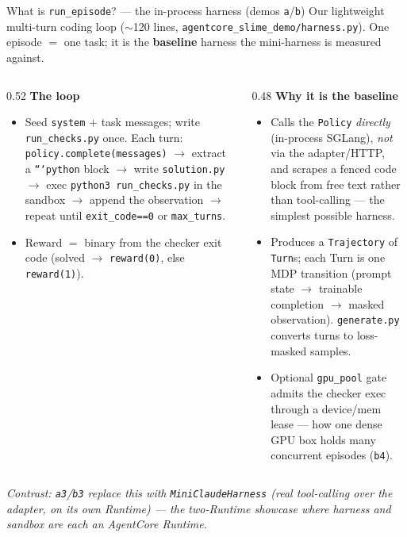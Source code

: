 \documentclass[aspectratio=169]{beamer}
\begin{document}
\begin{frame}{What is \texttt{run\_episode}? --- the in-process harness (demos \texttt{a}/\texttt{b})}
  \footnotesize Our lightweight multi-turn coding loop ($\sim$120 lines,
  \texttt{agentcore\_slime\_demo/harness.py}). One episode $=$ one task; it is the \textbf{baseline}
  harness the mini-harness is measured against.
  \begin{columns}[T]
    \begin{column}{0.52\textwidth}
      \textbf{The loop}
      \begin{itemize}\setlength\itemsep{0.12em}
        \item Seed \texttt{system} $+$ task messages; write \texttt{run\_checks.py} once. Each turn:
          \texttt{policy.complete(messages)} $\to$ extract a \texttt{```python} block $\to$ write
          \texttt{solution.py} $\to$ exec \texttt{python3 run\_checks.py} in the sandbox $\to$ append the
          observation $\to$ repeat until \texttt{exit\_code==0} or \texttt{max\_turns}.
        \item Reward $=$ binary from the checker exit code (solved $\to$ \texttt{reward(0)}, else
          \texttt{reward(1)}).
      \end{itemize}
    \end{column}
    \begin{column}{0.48\textwidth}
      \textbf{Why it is the baseline}
      \begin{itemize}\setlength\itemsep{0.12em}
        \item Calls the \texttt{Policy} \emph{directly} (in-process SGLang), \emph{not} via the
          adapter/HTTP, and scrapes a fenced code block from free text rather than tool-calling ---
          the simplest possible harness.
        \item Produces a \texttt{Trajectory} of \texttt{Turn}s; each Turn is one MDP transition
          (prompt state $\to$ trainable completion $\to$ masked observation). \texttt{generate.py}
          converts turns to loss-masked samples.
        \item Optional \texttt{gpu\_pool} gate admits the checker exec through a device/mem lease ---
          how one dense GPU box holds many concurrent episodes (\texttt{b4}).
      \end{itemize}
    \end{column}
  \end{columns}
  \vspace{0.2em}
  {\scriptsize\itshape Contrast: \texttt{a3}/\texttt{b3} replace this with \texttt{MiniClaudeHarness}
  (real tool-calling over the adapter, on its \emph{own} Runtime) --- the two-Runtime showcase where
  harness \emph{and} sandbox are each an AgentCore Runtime.}
\end{frame}
\end{document}
